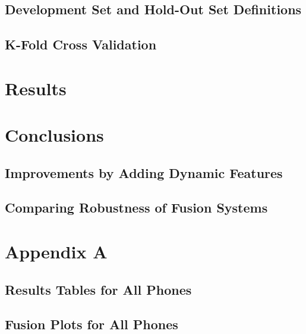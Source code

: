 \documentclass[11pt,a4paper]{tesis}
\begin{document}
	\section{Development Set and Hold-Out Set Definitions}
		
	\section{K-Fold Cross Validation}
		

\chapter{Results}
	

\chapter{Conclusions}
	\section{Improvements by Adding Dynamic Features}
	\section{Comparing Robustness of Fusion Systems}

\chapter{Appendix A}
	\section{Results Tables for All Phones}
		
	\section{Fusion Plots for All Phones}
		

\printbibliography
\end{document}

